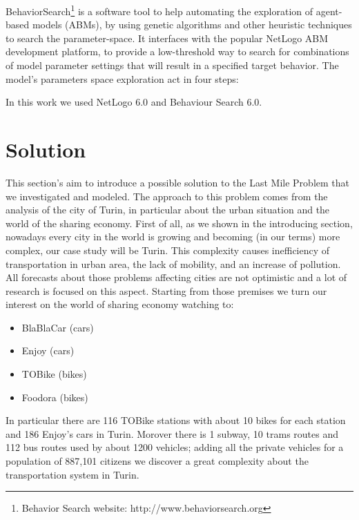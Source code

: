 \documentclass[11pt,a4paper]{article}
\begin{document}
BehaviorSearch\footnote{Behavior Search website: http://www.behaviorsearch.org} is a software tool to help automating the exploration of agent-based models (ABMs), by using genetic algorithms and other heuristic techniques to search the parameter-space. 
It interfaces with the popular NetLogo ABM development platform, to provide a low-threshold way to search for combinations of model parameter settings that will result in a specified target behavior. 
The model's parameters space exploration act in four steps:
\begin{center}
 \end{center}
\bigskip
In this work we used NetLogo 6.0 and Behaviour Search 6.0.

\newpage 
\section{Solution}
This section's aim to introduce a possible solution to the Last Mile Problem that we investigated and modeled. 
The approach to this problem comes from the analysis of the city of Turin, in particular about the urban situation and the world of the sharing economy. 
First of all, as we shown in the introducing section, nowadays every city in the world is growing and becoming (in our terms) more complex, our case study will be Turin. 
This complexity causes inefficiency of transportation in urban area, the lack of mobility, and an increase of pollution. 
All forecasts about those problems  affecting cities are not optimistic and a lot of research is focused on this aspect. 
Starting from those premises we turn our interest on the world of sharing economy watching to:
\begin{center}
\begin{itemize}
\item BlaBlaCar (cars)
\item Enjoy (cars)
\item TOBike (bikes)
\item Foodora (bikes)
\end{itemize}
\end{center}
In particular there are 116 TOBike stations with about 10 bikes for each station and 186 Enjoy's cars in Turin. 
Morover there is 1 subway, 10 trams routes and 112 bus routes used by about 1200 vehicles; adding all the private vehicles for a population of 887,101 citizens we discover a great complexity about the transportation system in Turin. 
\end{document}
